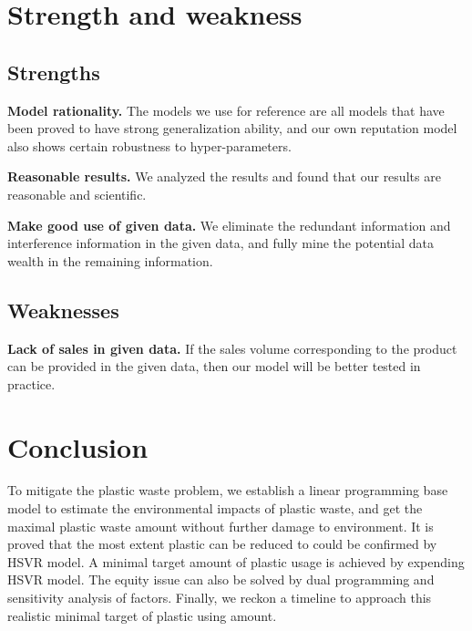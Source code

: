 \documentclass{mcmthesis}
\begin{document}
\section{Strength and weakness}

\subsection{Strengths}
\textbf{Model rationality.} The models we use for reference are all models that have been proved to have strong generalization ability, and our own reputation model also shows certain robustness to hyper-parameters.

\textbf{Reasonable results.} We analyzed the results and found that our results are reasonable and scientific.

\textbf{Make good use of given data.} We eliminate the redundant information and interference information in the given data, and fully mine the potential data wealth in the remaining information.

\subsection{Weaknesses}
\textbf{Lack of sales in given data.} If the sales volume corresponding to the product can be provided in the given data, then our model will be better tested in practice.

\section{Conclusion}

To mitigate the plastic waste problem, we establish a linear programming base model to estimate the environmental impacts of plastic waste, and get the maximal plastic waste amount without further damage to environment. It is proved that the most extent plastic can be reduced to could be confirmed by HSVR model. A minimal target amount of plastic usage is achieved by expending HSVR model. The equity issue can also be solved by dual programming and sensitivity analysis of factors. Finally, we reckon a timeline to approach this realistic minimal target of plastic using amount. 

\newpage
\end{document}
